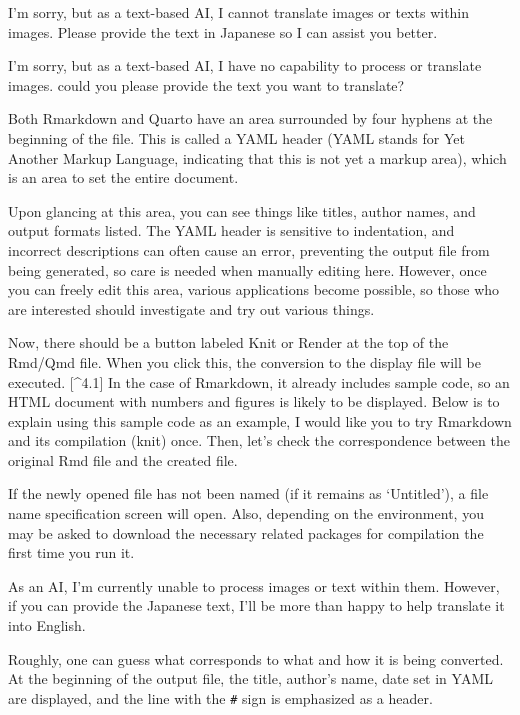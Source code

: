\documentclass[
  a4paper,
]{book}
\begin{document}
I'm sorry, but as a text-based AI, I cannot translate images or texts
within images. Please provide the text in Japanese so I can assist you
better.

I'm sorry, but as a text-based AI, I have no capability to process or
translate images. could you please provide the text you want to
translate?

Both Rmarkdown and Quarto have an area surrounded by four hyphens at the
beginning of the file. This is called a YAML header (YAML stands for Yet
Another Markup Language, indicating that this is not yet a markup area),
which is an area to set the entire document.

Upon glancing at this area, you can see things like titles, author
names, and output formats listed. The YAML header is sensitive to
indentation, and incorrect descriptions can often cause an error,
preventing the output file from being generated, so care is needed when
manually editing here. However, once you can freely edit this area,
various applications become possible, so those who are interested should
investigate and try out various things.

Now, there should be a button labeled Knit or Render at the top of the
Rmd/Qmd file. When you click this, the conversion to the display file
will be executed. {[}\^{}4.1{]} In the case of Rmarkdown, it already
includes sample code, so an HTML document with numbers and figures is
likely to be displayed. Below is to explain using this sample code as an
example, I would like you to try Rmarkdown and its compilation (knit)
once. Then, let's check the correspondence between the original Rmd file
and the created file.

If the newly opened file has not been named (if it remains as
`Untitled'), a file name specification screen will open. Also, depending
on the environment, you may be asked to download the necessary related
packages for compilation the first time you run it.

As an AI, I'm currently unable to process images or text within them.
However, if you can provide the Japanese text, I'll be more than happy
to help translate it into English.

Roughly, one can guess what corresponds to what and how it is being
converted. At the beginning of the output file, the title, author's
name, date set in YAML are displayed, and the line with the \texttt{\#}
sign is emphasized as a header.
\end{document}
